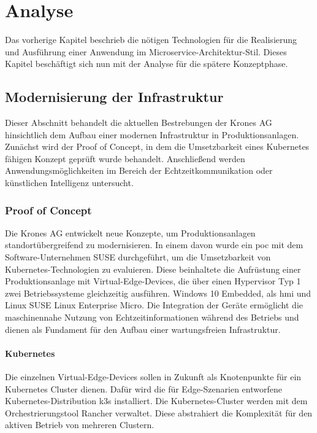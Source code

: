 \chapter{Analyse}

Das vorherige Kapitel beschrieb die nötigen Technologien für die Realisierung und Ausführung einer Anwendung im Microservice-Architektur-Stil.
Dieses Kapitel beschäftigt sich nun mit der Analyse für die spätere Konzeptphase.

\section{Modernisierung der Infrastruktur}\label{moderninfra}
Dieser Abschnitt behandelt die aktuellen Bestrebungen der Krones AG hinsichtlich dem Aufbau einer modernen Infrastruktur in Produktionsanlagen. 
Zunächst wird der Proof of Concept, in dem die Umsetzbarkeit eines Kubernetes fähigen Konzept geprüft wurde behandelt. 
Anschließend werden Anwendungsmöglichkeiten im Bereich der Echtzeitkommunikation oder künstlichen Intelligenz untersucht. 

\subsection{Proof of Concept}
Die Krones AG entwickelt neue Konzepte, um Produktionsanlagen standortübergreifend zu modernisieren. 
In einem davon wurde ein \ac{poc} mit dem Software-Unternehmen SUSE durchgeführt, um die Umsetzbarkeit von Kubernetes-Technologien zu evaluieren. 
Diese beinhaltete die Aufrüstung einer Produktionsanlage mit Virtual-Edge-Devices, 
die über einen Hypervisor Typ 1 zwei Betriebssysteme gleichzeitig ausführen. Windows 10 Embedded, als \ac{hmi} und Linux SUSE Linux Enterprise Micro. 
Die Integration der Geräte ermöglicht die maschinennahe Nutzung von Echtzeitinformationen während des Betriebs und dienen als Fundament für den Aufbau einer wartungsfreien Infrastruktur.

\subsubsection{Kubernetes}
Die einzelnen Virtual-Edge-Devices sollen in Zukunft als Knotenpunkte für ein Kubernetes Cluster dienen. 
Dafür wird die für Edge-Szenarien entworfene Kubernetes-Distribution k3s installiert. 
Die Kubernetes-Cluster werden mit dem Orchestrierungstool Rancher verwaltet. 
Diese abstrahiert die Komplexität für den aktiven Betrieb von mehreren Clustern.


